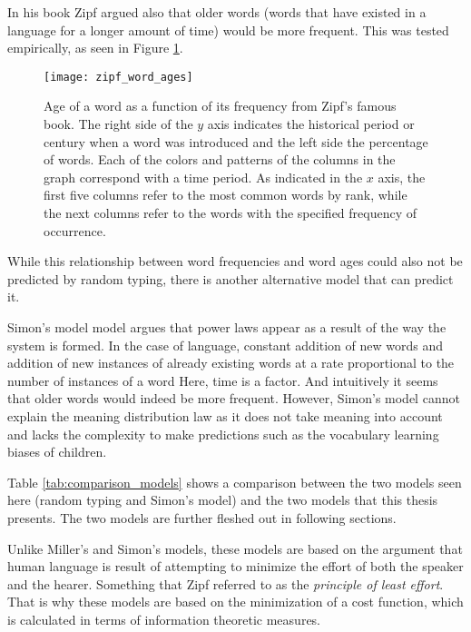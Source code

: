 In his book \cite{Zipf1949a} Zipf argued also that older words (words that have existed in a language for a longer amount of time) would be more frequent.
This was tested empirically, as seen in Figure \ref{fig:zipf_word_ages}.

\begin{figure}
  \centering
  \texttt{[image: zipf\_word\_ages]}
  \caption{
    Age of a word as a function of its frequency from Zipf's famous book. \cite{Zipf1949a}
    The right side of the $y$ axis indicates the historical period or century when a word was introduced and the left side the percentage of words.
    Each of the colors and patterns of the columns in the graph correspond with a time period.
    As indicated in the $x$ axis, the first five columns refer to the most common words by rank, while the next columns refer to the words with the specified frequency of occurrence.
  }
  \label{fig:zipf_word_ages}
\end{figure}

While this relationship between word frequencies and word ages could also not be predicted by random typing, there is another alternative model that can predict it.

Simon's model \cite{Simon1955} model argues that power laws appear as a result of the way the system is formed.
In the case of language, constant addition of new words and addition of new instances of already existing words at a rate proportional to the number of instances of a word
Here, time is a factor. And intuitively it seems that older words would indeed be more frequent.
However, Simon's model cannot explain the meaning distribution law as it does not take meaning into account and lacks the complexity to make predictions such as the vocabulary learning biases of children.

Table \ref{tab:comparison_models} shows a comparison between the two models seen here (random typing and Simon's model) and the two models that this thesis presents.
The two models are further fleshed out in following sections.




Unlike Miller's and Simon's models, these models are based on the argument that human language is result of attempting to minimize the effort of both the speaker and the hearer. \cite{Ferrer2003a} \cite{Zipf1949a} Something that Zipf referred to as the \emph{principle of least effort}. That is why these models are based on the minimization of a cost function, which is calculated in terms of information theoretic measures.

